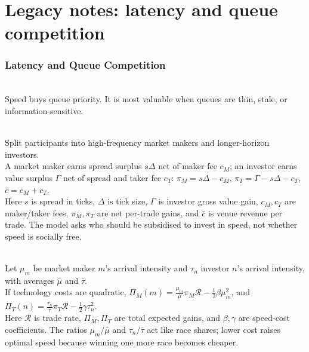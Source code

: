 \documentclass[a4paper,oneside,openany]{book}
\begin{document}
\chapter*{Legacy notes: latency and queue competition}

\subsection*{Latency and Queue Competition}

\begin{principle} \\
Speed buys queue priority. It is most valuable when queues are thin, stale, or information-sensitive.
\end{principle}

\begin{model} \\
Split participants into high-frequency market makers and longer-horizon investors.\\
A market maker earns spread surplus $s\Delta$ net of maker fee $c_M$; an investor earns value surplus $\Gamma$ net of spread and taker fee $c_T$: $\pi_M=s\Delta-c_M$, $\pi_T=\Gamma-s\Delta-c_T$, $\bar{c}=c_M+c_T$.\\
Here $s$ is spread in ticks, $\Delta$ is tick size, $\Gamma$ is investor gross value gain, $c_M,c_T$ are maker/taker fees, $\pi_M,\pi_T$ are net per-trade gains, and $\bar{c}$ is venue revenue per trade. The model asks who should be subsidised to invest in speed, not whether speed is socially free.
\end{model}

\begin{mechanism} \\
Let $\mu_m$ be market maker $m$'s arrival intensity and $\tau_n$ investor $n$'s arrival intensity, with averages $\bar{\mu}$ and $\bar{\tau}$.\\
If technology costs are quadratic, $\Pi_M(m)=\frac{\mu_m}{\bar{\mu}}\pi_M\mathcal{R}-\frac{1}{2}\beta\mu_m^2$, and $\Pi_T(n)=\frac{\tau_n}{\bar{\tau}}\pi_T\mathcal{R}-\frac{1}{2}\gamma\tau_n^2$.\\
Here $\mathcal{R}$ is trade rate, $\Pi_M,\Pi_T$ are total expected gains, and $\beta,\gamma$ are speed-cost coefficients. The ratios $\mu_m/\bar{\mu}$ and $\tau_n/\bar{\tau}$ act like race shares; lower cost raises optimal speed because winning one more race becomes cheaper.
\end{mechanism}
\end{document}
